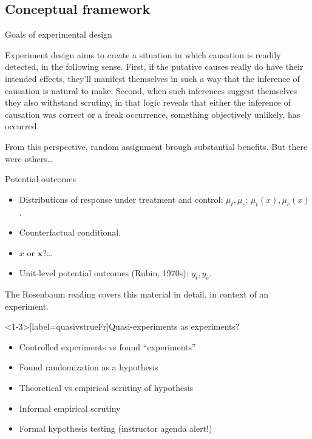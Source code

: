 \subsection{Conceptual framework}
\begin{frame}{Goals of experimental design}

Experiment design aims to create a situation in which causation is
readily detected, in the following sense. First, if the putative causes
really do have their intended effects, they'll manifest themselves in
such a way that the inference of causation is natural to make. Second,
when such inferences suggest themselves they also withstand scrutiny, in
that logic reveals that either the inference of causation was correct or
a freak occurrence, something objectively unlikely, has occurred.

From this perspective, random assignment brough substantial benefits. But there were others\ldots

\end{frame}

\begin{frame}{Potential outcomes}
  
  \begin{itemize}[<+->]
  \item Distributions of response under treatment and control: $\mu_{t},
    \mu_{c}$; $\mu_{t}(x), \mu_{c}(x)$.
  \item Counterfactual conditional.
  \item $x$ or $\mathbf{x}$?\ldots
  \item Unit-level potential outcomes (Rubin, 1970s): $y_{t}, y_{c}$.
  \end{itemize}

The Rosenbaum reading covers this material in detail, in context of an experiment.
\end{frame}

\begin{frame}<1-3>[label=quasivstrueFr]{Quasi-experiments as
    experiments?}
  \begin{itemize}[<+->]
  \item Controlled experiments vs found ``experiments''
  \item Found randomization as a hypothesis
  \item Theoretical vs empirical scrutiny of hypothesis
  \item Informal empirical scrutiny
  \item Formal hypothesis testing (instructor agenda alert!)
  \end{itemize}
\end{frame}

